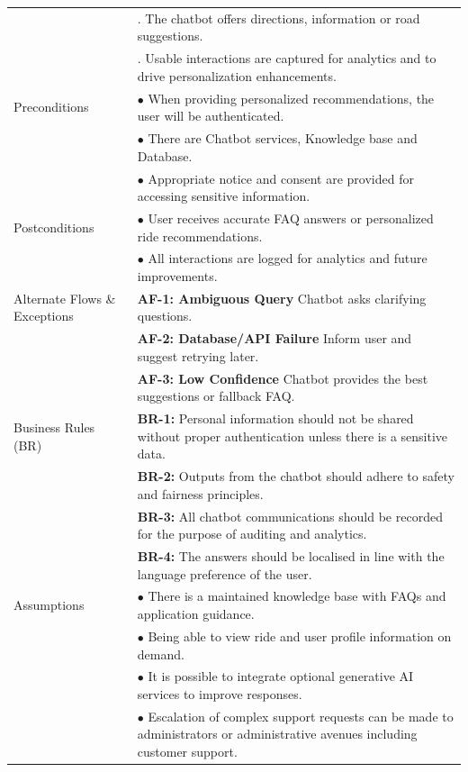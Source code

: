 \begin{longtable}{|>{\raggedright\arraybackslash}p{4cm}|>{\raggedright\arraybackslash}p{11cm}|}
& 5. The chatbot offers directions, information or road suggestions. \\
& 6. Usable interactions are captured for analytics and to drive personalization enhancements. \\
\hline
Preconditions & $\bullet$ When providing personalized recommendations, the user will be authenticated. \\
& $\bullet$ There are Chatbot services, Knowledge base and Database. \\
& $\bullet$ Appropriate notice and consent are provided for accessing sensitive information. \\
\hline
Postconditions & $\bullet$ User receives accurate FAQ answers or personalized ride recommendations. \\
& $\bullet$ All interactions are logged for analytics and future improvements. \\
\hline
Alternate Flows \& Exceptions & \textbf{AF-1: Ambiguous Query} \newline Chatbot asks clarifying questions. \\
& \textbf{AF-2: Database/API Failure} \newline Inform user and suggest retrying later. \\
& \textbf{AF-3: Low Confidence} \newline Chatbot provides the best suggestions or fallback FAQ. \\
\hline
Business Rules (BR) & \textbf{BR-1:} Personal information should not be shared without proper authentication unless there is a sensitive data. \\
& \textbf{BR-2:} Outputs from the chatbot should adhere to safety and fairness principles. \\
& \textbf{BR-3:} All chatbot communications should be recorded for the purpose of auditing and analytics. \\
& \textbf{BR-4:} The answers should be localised in line with the language preference of the user. \\
\hline
Assumptions & $\bullet$ There is a maintained knowledge base with FAQs and application guidance. \\
& $\bullet$ Being able to view ride and user profile information on demand. \\
& $\bullet$ It is possible to integrate optional generative AI services to improve responses. \\
& $\bullet$ Escalation of complex support requests can be made to administrators or administrative avenues including customer support. \\
\hline
\end{longtable}

